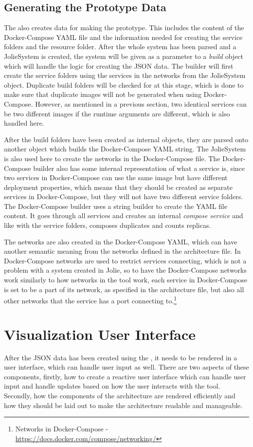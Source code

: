 \subsection{Generating the Prototype Data}
The \javatoolname[] also creates data for making the prototype. This includes the content of the Docker-Compose YAML file and the information needed for creating the service folders and the resource folder.
After the whole system has been parsed and a JolieSystem is created, the system will be given as a parameter to a \textit{build} object which will handle the logic for creating the JSON data.
The builder will first create the service folders using the services in the networks from the JolieSystem object. Duplicate build folders will be checked for at this stage, which is done to make sure that duplicate images will not be generated when using Docker-Compose.
However, as mentioned in a previous section, two identical services can be two different images if the runtime arguments are different, which is also handled here.

After the build folders have been created as internal objects, they are parsed onto another object which builds the Docker-Compose YAML string. The JolieSystem is also used here to create the networks in the Docker-Compose file.
The Docker-Compose builder also has some internal representation of what a service is, since two services in Docker-Compose can use the same image but have different deployment properties, which means that they should be created as separate services in Docker-Compose, but they will not have two different service folders.
The Docker-Compose builder uses a string builder to create the YAML file content. It goes through all services and creates an internal \textit{compose service} and like with the service folders, composes duplicates and counts replicas.

The networks are also created in the Docker-Compose YAML, which can have another semantic meaning from the networks defined in the architecture file.
In Docker-Compose networks are used to restrict services connecting, which is not a problem with a system created in Jolie, so to have the Docker-Compose networks work similarly to how networks in the tool work, each service in Docker-Compose is set to be a part of
its network, as specified in the architecture file, but also all other networks that the service has a port connecting to.\footnote{Networks in Docker-Compose - \url{https://docs.docker.com/compose/networking/}}

\section{Visualization User Interface}
After the JSON data has been created using the \javatoolname[], it needs to be rendered in a user interface, which can handle user input as well.
There are two aspects of these components, firstly, how to create a reactive user interface which can handle user input and handle updates based on how the user interacts with the tool. Secondly, how the components of the architecture are rendered efficiently and how they should be laid out to make the architecture readable and manageable.

